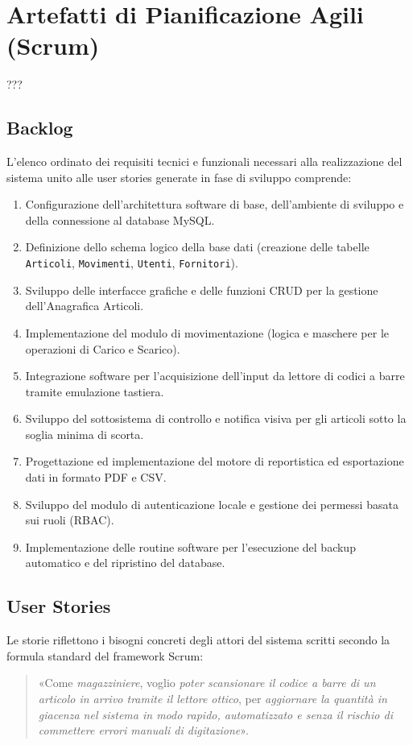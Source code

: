 \documentclass[a4paper,12pt]{article}
\begin{document}
	\section{Artefatti di Pianificazione Agili (Scrum)}???

	\subsection{Backlog}
	L'elenco ordinato dei requisiti tecnici e funzionali necessari alla realizzazione del sistema unito alle user stories generate in fase di sviluppo comprende:
	\begin{enumerate}
		\item Configurazione dell'architettura software di base, dell'ambiente di sviluppo e della connessione al database MySQL.
		\item Definizione dello schema logico della base dati (creazione delle tabelle \texttt{Articoli}, \texttt{Movimenti}, \texttt{Utenti}, \texttt{Fornitori}).
		\item Sviluppo delle interfacce grafiche e delle funzioni CRUD per la gestione dell'Anagrafica Articoli.
		\item Implementazione del modulo di movimentazione (logica e maschere per le operazioni di Carico e Scarico).
		\item Integrazione software per l'acquisizione dell'input da lettore di codici a barre tramite emulazione tastiera.
		\item Sviluppo del sottosistema di controllo e notifica visiva per gli articoli sotto la soglia minima di scorta.
		\item Progettazione ed implementazione del motore di reportistica ed esportazione dati in formato PDF e CSV.
		\item Sviluppo del modulo di autenticazione locale e gestione dei permessi basata sui ruoli (RBAC).
		\item Implementazione delle routine software per l'esecuzione del backup automatico e del ripristino del database.
	\end{enumerate}

	\subsection{User Stories}
	Le storie riflettono i bisogni concreti degli attori del sistema scritti secondo la formula standard del framework Scrum:
	\begin{quote}
		«Come \textit{magazziniere}, voglio \textit{poter scansionare il codice a barre di un articolo in arrivo tramite il lettore ottico}, per \textit{aggiornare la quantità in giacenza nel sistema in modo rapido, automatizzato e senza il rischio di commettere errori manuali di digitazione}».
	\end{quote}
\end{document}
